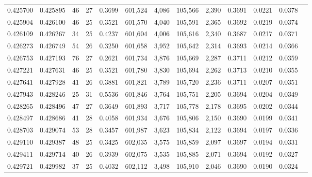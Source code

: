 \begin{tabular}{rrrrrrrrrrrrr}
0.425700 & 0.425895 &    46 &  27 &                                     0.3699 & 601,524 &   4,086 & 105,566 &   2,390 & 0.3691 & 0.0221 & 0.0378 \\
0.425904 & 0.426100 &    46 &  25 &                                     0.3521 & 601,570 &   4,040 & 105,591 &   2,365 & 0.3692 & 0.0219 & 0.0374 \\
0.426109 & 0.426267 &    34 &  25 &                                     0.4237 & 601,604 &   4,006 & 105,616 &   2,340 & 0.3687 & 0.0217 & 0.0371 \\
0.426273 & 0.426749 &    54 &  26 &                                     0.3250 & 601,658 &   3,952 & 105,642 &   2,314 & 0.3693 & 0.0214 & 0.0366 \\
0.426753 & 0.427193 &    76 &  27 &                                     0.2621 & 601,734 &   3,876 & 105,669 &   2,287 & 0.3711 & 0.0212 & 0.0359 \\
0.427221 & 0.427631 &    46 &  25 &                                     0.3521 & 601,780 &   3,830 & 105,694 &   2,262 & 0.3713 & 0.0210 & 0.0355 \\
0.427641 & 0.427928 &    41 &  26 &                                     0.3881 & 601,821 &   3,789 & 105,720 &   2,236 & 0.3711 & 0.0207 & 0.0351 \\
0.427943 & 0.428246 &    25 &  31 &                                     0.5536 & 601,846 &   3,764 & 105,751 &   2,205 & 0.3694 & 0.0204 & 0.0349 \\
0.428265 & 0.428496 &    47 &  27 &                                     0.3649 & 601,893 &   3,717 & 105,778 &   2,178 & 0.3695 & 0.0202 & 0.0344 \\
0.428497 & 0.428686 &    41 &  28 &                                     0.4058 & 601,934 &   3,676 & 105,806 &   2,150 & 0.3690 & 0.0199 & 0.0341 \\
0.428703 & 0.429074 &    53 &  28 &                                     0.3457 & 601,987 &   3,623 & 105,834 &   2,122 & 0.3694 & 0.0197 & 0.0336 \\
0.429110 & 0.429387 &    48 &  25 &                                     0.3425 & 602,035 &   3,575 & 105,859 &   2,097 & 0.3697 & 0.0194 & 0.0331 \\
0.429411 & 0.429714 &    40 &  26 &                                     0.3939 & 602,075 &   3,535 & 105,885 &   2,071 & 0.3694 & 0.0192 & 0.0327 \\
0.429721 & 0.429982 &    37 &  25 &                                     0.4032 & 602,112 &   3,498 & 105,910 &   2,046 & 0.3690 & 0.0190 & 0.0324 \\

\end{tabular}
